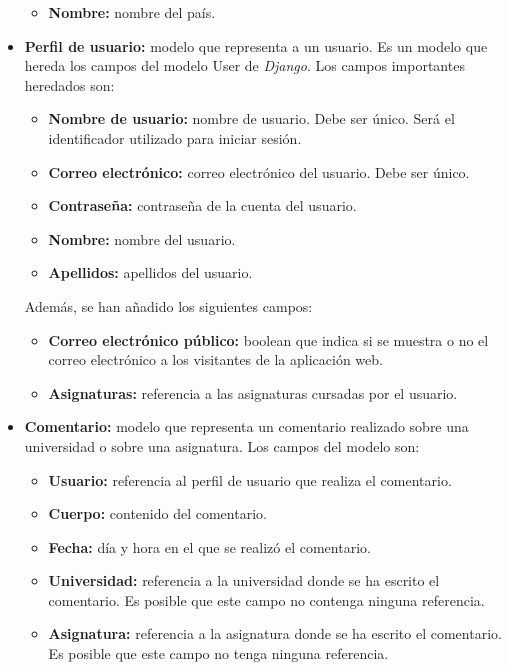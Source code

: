 \documentclass[a4paper, 12pt]{book}
\begin{document}
\begin{itemize}
\begin{itemize}
        \item \textbf{Nombre:} nombre del país.
    \end{itemize}
    \item \textbf{Perfil de usuario:} modelo que representa a un usuario. Es un modelo que hereda los campos del modelo User de \textit{Django}. Los campos importantes heredados son:
     \begin{itemize}
        \item \textbf{Nombre de usuario:} nombre de usuario. Debe ser único. Será el identificador utilizado para iniciar sesión.
        \item \textbf{Correo electrónico:} correo electrónico del usuario. Debe ser único.
        \item \textbf{Contraseña:} contraseña de la cuenta del usuario.
        \item \textbf{Nombre:} nombre del usuario.
        \item \textbf{Apellidos:} apellidos del usuario.
    \end{itemize}
Además, se han añadido los siguientes campos:
    \begin{itemize}
        \item \textbf{Correo electrónico público:} boolean que indica si se muestra o no el correo electrónico a los visitantes de la aplicación web.
        \item \textbf{Asignaturas:} referencia a las asignaturas cursadas por el usuario.
    \end{itemize}
    \item \textbf{Comentario:} modelo que representa un comentario realizado sobre una universidad o sobre una asignatura. Los campos del modelo son:
    \begin{itemize}
        \item \textbf{Usuario:} referencia al perfil de usuario que realiza el comentario.
        \item \textbf{Cuerpo:} contenido del comentario.
        \item \textbf{Fecha:} día y hora en el que se realizó el comentario.
        \item \textbf{Universidad:} referencia a la universidad donde se ha escrito el comentario. Es posible que este campo no contenga ninguna referencia.
        \item \textbf{Asignatura:} referencia a la asignatura donde se ha escrito el comentario.  Es posible que este campo no tenga ninguna referencia.
    \end{itemize}
\end{itemize}
\end{document}
